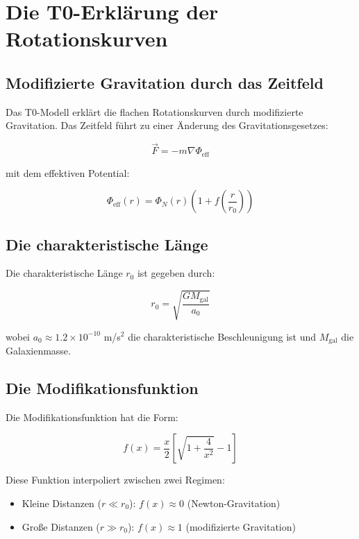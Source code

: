 \documentclass[12pt,a4paper]{report}
\begin{document}
	\section{Die T0-Erklärung der Rotationskurven}
	
	\subsection{Modifizierte Gravitation durch das Zeitfeld}
	
	Das T0-Modell erklärt die flachen Rotationskurven durch modifizierte Gravitation. Das Zeitfeld führt zu einer Änderung des Gravitationsgesetzes:
	
	\begin{equation}
		\vec{F} = -m\nabla\Phi_{\text{eff}}
	\end{equation}
	
	mit dem effektiven Potential:
	
	\begin{equation}
		\Phi_{\text{eff}}(r) = \Phi_N(r)\left(1 + f\left(\frac{r}{r_0}\right)\right)
	\end{equation}
	
	\subsection{Die charakteristische Länge}
	
	Die charakteristische Länge $r_0$ ist gegeben durch:
	
	\begin{equation}
		r_0 = \sqrt{\frac{GM_{\text{gal}}}{a_0}}
	\end{equation}
	
	wobei $a_0 \approx 1.2 \times 10^{-10}$ m/s$^2$ die charakteristische Beschleunigung ist und $M_{\text{gal}}$ die Galaxienmasse.
	
	\subsection{Die Modifikationsfunktion}
	
	Die Modifikationsfunktion hat die Form:
	
	\begin{equation}
		f(x) = \frac{x}{2}\left[\sqrt{1 + \frac{4}{x^2}} - 1\right]
	\end{equation}
	
	Diese Funktion interpoliert zwischen zwei Regimen:
	\begin{itemize}
		\item Kleine Distanzen ($r \ll r_0$): $f(x) \approx 0$ (Newton-Gravitation)
		\item Große Distanzen ($r \gg r_0$): $f(x) \approx 1$ (modifizierte Gravitation)
	\end{itemize}
	
\end{document}
